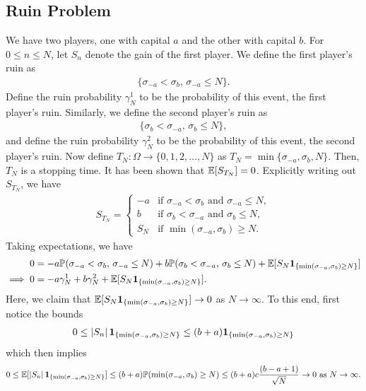 \subsection{Ruin Problem}
We have two players, one with capital $a$ and the other with capital $b$. For $0 \leq n \leq N$, let $S_{n}$ denote the gain of the first player. We define the first player's ruin as
\begin{align}
    \{\sigma_{-a} < \sigma_{b},\, \sigma_{-a} \leq N\}.
\end{align}
Define the ruin probability $\gamma_{N}^{1}$ to be the probability of this event, the first player's ruin. Similarly, we define the second player's ruin as
\begin{align}
    \{\sigma_{b} < \sigma_{-a},\, \sigma_{b} \leq N\},
\end{align}
and define the ruin probability $\gamma_{N}^{2}$ to be the probability of this event, the second player's ruin. Now define $T_{N}:\Omega \to \{0,1,2,\ldots,N\}$ as $T_{N} = \min\{\sigma_{-a},\sigma_{b},N\}$. Then, $T_{N}$ is a stopping time. It has been shown that $\mathbb{E}[S_{T_{N}}] = 0$. Explicitly writing out $S_{T_{N}}$, we have
\begin{align}
    S_{T_{N}} = \begin{cases}
        -a &\text{if } \sigma_{-a} < \sigma_{b} \text{ and } \sigma_{-a} \leq N, \\
        b &\text{if } \sigma_{b} < \sigma_{-a} \text{ and } \sigma_{b} \leq N, \\
        S_{N} &\text{if } \min(\sigma_{-a},\sigma_{b}) \geq N.
    \end{cases}
\end{align}
Taking expectations, we have
\begin{align}
    0 &= -a\mathbb{P}(\sigma_{-a} < \sigma_{b},\, \sigma_{-a} \leq N) + b\mathbb{P}(\sigma_{b} < \sigma_{-a},\, \sigma_{b} \leq N) + \mathbb{E}[S_{N}\textbf{1}_{\{\min(\sigma_{-a},\sigma_{b}) \geq N\}}] \notag \\
    \implies 0 &= -a\gamma_{N}^{1} + b\gamma_{N}^{2} + \mathbb{E}[S_{N}\textbf{1}_{\{\min(\sigma_{-a},\sigma_{b}) \geq N\}}].
\end{align}
Here, we claim that $\mathbb{E}[S_{N}\textbf{1}_{\{\min(\sigma_{-a},\sigma_{b}) \geq N\}}] \to 0$ as $N \to \infty$. To this end, first notice the bounds
\begin{align}
    0 \leq \left| S_{n} \right| \textbf{1}_{\{\min(\sigma_{-a},\sigma_{b}) \geq N\}} \leq (b+a) \textbf{1}_{\{\min(\sigma_{-a},\sigma_{b}) \geq N\}}
\end{align}
which then implies
\begin{align}
    0 \leq \mathbb{E}[\left| S_{n} \right| \textbf{1}_{\{\min(\sigma_{-a},\sigma_{b}) \geq N\}}] \leq (b+a) \mathbb{P}(\min(\sigma_{-a},\sigma_{b}) \geq N) \leq (b+a) c\frac{(b-a+1)}{\sqrt{N}} \to 0 \text{ as } N \to \infty.
\end{align}
